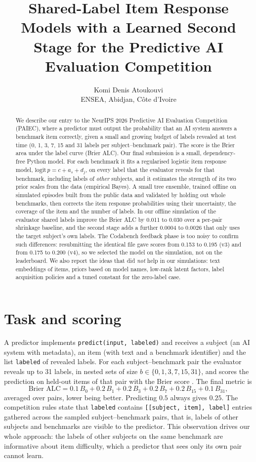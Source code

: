 \documentclass{article}
\title{Shared-Label Item Response Models with a Learned Second Stage for the Predictive AI Evaluation Competition}
\author{%
  Komi Denis Atoukouvi \\
  ENSEA, Abidjan, C\^ote d'Ivoire \\
}
\begin{document}
\maketitle

\begin{abstract}
We describe our entry to the NeurIPS 2026 Predictive AI Evaluation Competition (PAIEC), where a predictor must output the probability that an AI system answers a benchmark item correctly, given a small and growing budget of labels revealed at test time (0, 1, 3, 7, 15 and 31 labels per subject--benchmark pair). The score is the Brier area under the label curve (Brier ALC). Our final submission is a small, dependency-free Python model. For each benchmark it fits a regularised logistic item response model, $\mathrm{logit}\,p = c + a_{s} + d_{j}$, on every label that the evaluator reveals for that benchmark, including labels of \emph{other} subjects, and it estimates the strength of its two prior scales from the data (empirical Bayes). A small tree ensemble, trained offline on simulated episodes built from the public data and validated by holding out whole benchmarks, then corrects the item response probabilities using their uncertainty, the coverage of the item and the number of labels. In our offline simulation of the evaluator shared labels improve the Brier ALC by 0.011 to 0.030 over a per-pair shrinkage baseline, and the second stage adds a further 0.0004 to 0.0026 that only uses the target subject's own labels. The Codabench feedback phase is too noisy to confirm such differences: resubmitting the identical file gave scores from 0.153 to 0.195 (v3) and from 0.175 to 0.200 (v4), so we selected the model on the simulation, not on the leaderboard. We also report the ideas that did \emph{not} help in our simulations: text embeddings of items, priors based on model names, low-rank latent factors, label acquisition policies and a tuned constant for the zero-label case.
\end{abstract}

\section{Task and scoring}
\label{sec:task}
A predictor implements \texttt{predict(input, labeled)} and receives a subject (an AI system with metadata), an item (with text and a benchmark identifier) and the list \texttt{labeled} of revealed labels. For each subject--benchmark pair the evaluator reveals up to 31 labels, in nested sets of size $b\in\{0,1,3,7,15,31\}$, and scores the prediction on held-out items of that pair with the Brier score \citep{brier1950}. The final metric is
\[
\text{Brier ALC} = 0.1\,B_0 + 0.2\,B_1 + 0.2\,B_3 + 0.2\,B_7 + 0.2\,B_{15} + 0.1\,B_{31},
\]
averaged over pairs, lower being better. Predicting $0.5$ always gives $0.25$. The competition rules state that \texttt{labeled} contains \texttt{[[subject, item], label]} entries gathered across the sampled subject--benchmark pairs, that is, labels of other subjects and benchmarks are visible to the predictor. This observation drives our whole approach: the labels of other subjects on the same benchmark are informative about item difficulty, which a predictor that sees only its own pair cannot learn.
\end{document}
